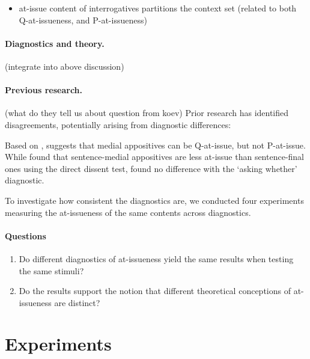 \documentclass[12pt]{article}
\begin{document}
    \citealt{tonhauser_how_2018}
    \begin{itemize}
      \item at-issue content of interrogatives partitions the context set (related to both Q-at-issueness, and P-at-issueness)
    \end{itemize}

  \paragraph{Diagnostics and theory.} (integrate into above discussion)
    

  \paragraph{Previous research.} (what do they tell us about question from koev)
    Prior research has identified disagreements, potentially arising from  diagnostic differences:

    Based on , \citealt{koev_notions_2018} suggests that medial appositives can be Q-at-issue, but not P-at-issue. While \citealt{syrett_experimental_2015} found that sentence-medial appositives are less at-issue than sentence-final ones using the direct dissent test, \citealt{drozdov_projection_2024} found no difference with the `asking whether' diagnostic.

    To investigate how consistent the diagnostics are, we conducted four experiments measuring the at-issueness of the same contents across diagnostics.

  \paragraph{Questions} %
    \begin{enumerate}
      \item Do different diagnostics of at-issueness yield the same results when testing the same stimuli?
      \item Do the results support the notion that different theoretical conceptions of at-issueness are distinct?
    \end{enumerate}

\section{Experiments}
\end{document}
